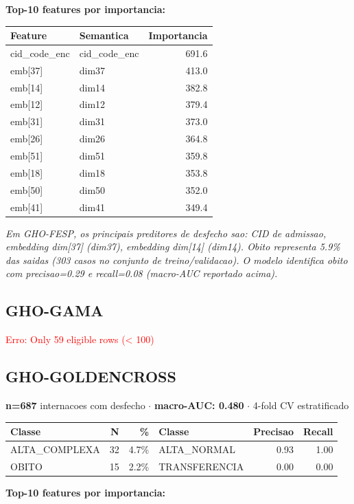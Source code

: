 \documentclass[11pt,a4paper]{article}
\begin{document}
\vspace{4pt}\noindent\textbf{Top-10 features por importancia:}

\begin{tabular}{llr}
\toprule
Feature & Semantica & Importancia \\
\midrule
cid\_code\_enc & cid\_code\_enc & 691.6 \\
emb[37] & dim37 & 413.0 \\
emb[14] & dim14 & 382.8 \\
emb[12] & dim12 & 379.4 \\
emb[31] & dim31 & 373.0 \\
emb[26] & dim26 & 364.8 \\
emb[51] & dim51 & 359.8 \\
emb[18] & dim18 & 353.8 \\
emb[50] & dim50 & 352.0 \\
emb[41] & dim41 & 349.4 \\
\bottomrule
\end{tabular}

\vspace{4pt}\noindent\textit{Em GHO-FESP, os principais preditores de desfecho sao: CID de admissao, embedding dim[37] (dim37), embedding dim[14] (dim14). Obito representa 5.9\% das saidas (303 casos no conjunto de treino/validacao). O modelo identifica obito com precisao=0.29 e recall=0.08 (macro-AUC reportado acima).}

\subsection{GHO-GAMA}
\textcolor{red}{Erro: Only 59 eligible rows (< 100)}

\subsection{GHO-GOLDENCROSS}
\textbf{n=687} internacoes com desfecho $\cdot$ \textbf{macro-AUC: 0.480} $\cdot$ 4-fold CV estratificado

\begin{tabular}{lrr|lrr}
\toprule
Classe & N & \% & Classe & Precisao & Recall \\
\midrule
ALTA\_COMPLEXA & 32 & 4.7\% & ALTA\_NORMAL & 0.93 & 1.00 \\
OBITO & 15 & 2.2\% & TRANSFERENCIA & 0.00 & 0.00 \\
\bottomrule
\end{tabular}

\vspace{4pt}\noindent\textbf{Top-10 features por importancia:}
\end{document}

